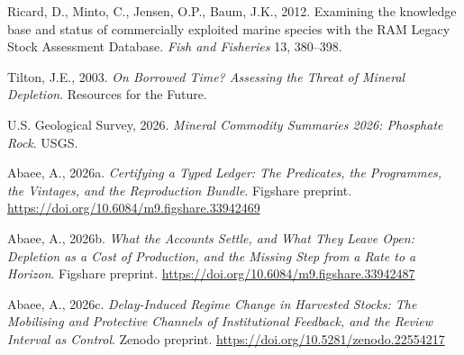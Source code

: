 \documentclass[11pt]{article}
\begin{document}
Ricard, D., Minto, C., Jensen, O.P., Baum, J.K., 2012. Examining the knowledge base and status of commercially exploited marine species with the RAM Legacy Stock Assessment Database. \emph{Fish and Fisheries} 13, 380--398.

Tilton, J.E., 2003. \emph{On Borrowed Time? Assessing the Threat of Mineral Depletion}. Resources for the Future.

U.S. Geological Survey, 2026. \emph{Mineral Commodity Summaries 2026: Phosphate Rock}. USGS.

Abaee, A., 2026a. \emph{Certifying a Typed Ledger: The Predicates, the Programmes, the Vintages, and the Reproduction Bundle}. Figshare preprint. \url{https://doi.org/10.6084/m9.figshare.33942469}

Abaee, A., 2026b. \emph{What the Accounts Settle, and What They Leave Open: Depletion as a Cost of Production, and the Missing Step from a Rate to a Horizon}. Figshare preprint. \url{https://doi.org/10.6084/m9.figshare.33942487}

Abaee, A., 2026c. \emph{Delay-Induced Regime Change in Harvested Stocks: The Mobilising and Protective Channels of Institutional Feedback, and the Review Interval as Control}. Zenodo preprint. \url{https://doi.org/10.5281/zenodo.22554217}
\end{document}
